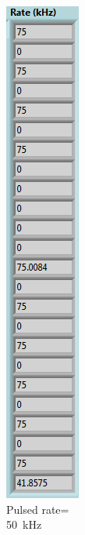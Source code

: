 \begin{figure}[H]
\begin{minipage}{0.24\textwidth}
		\caption{Pulsed rate=\\50~kHz}
		\label{fig:50khz}
	\end{minipage}
	\begin{minipage}{0.24\textwidth}
		\centering
		\includegraphics[width=.75\linewidth]{IMG/ch5/latch_tests/fig18}

\end{minipage}
\end{figure}
